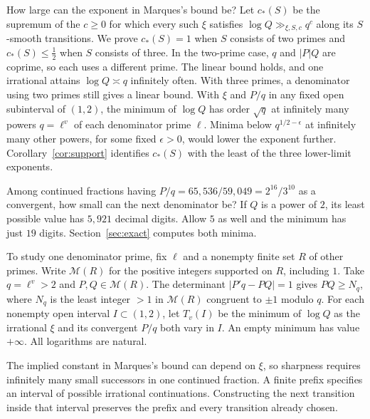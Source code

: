 \documentclass[11pt]{article}
\newcommand{\M}{\mathcal M}
\begin{document}
How large can the exponent in Marques's bound be? Let $c_*(S)$ be the
supremum of the $c\ge0$ for which every such $\xi$ satisfies $\log Q\gg_{\xi,S,c}q^c$
along its $S$-smooth transitions. We prove $c_*(S)=1$ when $S$ consists
of two primes and $c_*(S)\le\tfrac12$ when $S$ consists of three.
In the two-prime case, $q$ and $|P|Q$ are coprime, so each uses a different
prime. The linear bound holds, and one irrational attains $\log Q\asymp q$
infinitely often. With three primes, a denominator using two primes still
gives a linear bound. With $\xi$ and $P/q$ in any fixed open subinterval
of $(1,2)$, the minimum of $\log Q$ has order $\sqrt q$ at infinitely many
powers $q=\ell^v$ of each denominator prime $\ell$.
Minima below $q^{1/2-\epsilon}$ at infinitely many other powers, for some
fixed $\epsilon>0$, would lower the exponent further. Corollary~\ref{cor:support}
identifies $c_*(S)$ with the least of the three lower-limit exponents.

Among continued fractions having $P/q=65{,}536/59{,}049=2^{16}/3^{10}$
as a convergent, how small can the next denominator be? If $Q$ is a power
of $2$, its least possible value has $5{,}921$ decimal digits. Allow $5$
as well and the minimum has just $19$ digits. Section~\ref{sec:exact}
computes both minima.

To study one denominator prime, fix $\ell$ and a nonempty finite set $R$
of other primes. Write $\M(R)$ for the positive integers supported on
$R$, including $1$. Take $q=\ell^v>2$ and $P,Q\in\M(R)$. The determinant
$|P'q-P Q|=1$ gives $P Q\ge N_q$, where $N_q$ is the least integer $>1$
in $\M(R)$ congruent to $\pm1$ modulo $q$. For each nonempty open
interval $I\subset(1,2)$, let $T_v(I)$ be the minimum of $\log Q$ as
the irrational $\xi$ and its convergent $P/q$ both vary in $I$. An
empty minimum has value $+\infty$. All logarithms are natural.

The implied constant in Marques's bound can depend on $\xi$, so sharpness
requires infinitely many small successors in one continued fraction. A
finite prefix specifies an interval of possible irrational continuations.
Constructing the next transition inside that interval preserves the prefix
and every transition already chosen.
\end{document}
